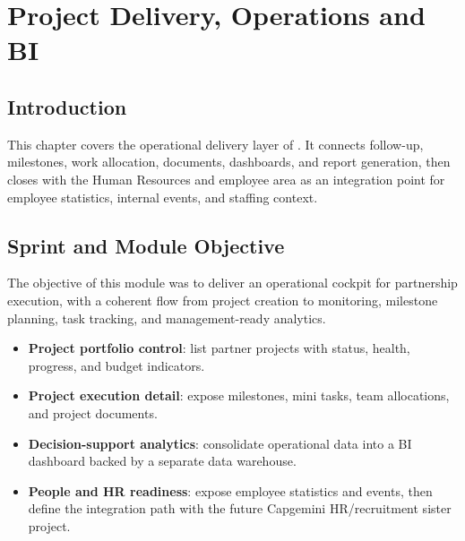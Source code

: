 \chapter{Project Delivery, Operations and BI}
\section*{Introduction}
This chapter covers the operational delivery layer of \projectname{}. It connects follow-up, milestones, work allocation, documents, dashboards, and report generation, then closes with the Human Resources and employee area as an integration point for employee statistics, internal events, and staffing context.
\section{Sprint and Module Objective}
The objective of this module was to deliver an operational cockpit for partnership execution, with a coherent flow from project creation to monitoring, milestone planning, task tracking, and management-ready analytics.
\begin{itemize}
  \item \textbf{Project portfolio control}: list partner projects with status, health, progress, and budget indicators.
  \item \textbf{Project execution detail}: expose milestones, mini tasks, team allocations, and project documents.
  \item \textbf{Decision-support analytics}: consolidate operational data into a BI dashboard backed by a separate data warehouse.
  \item \textbf{People and HR readiness}: expose employee statistics and events, then define the integration path with the future Capgemini HR/recruitment sister project.
\end{itemize}
